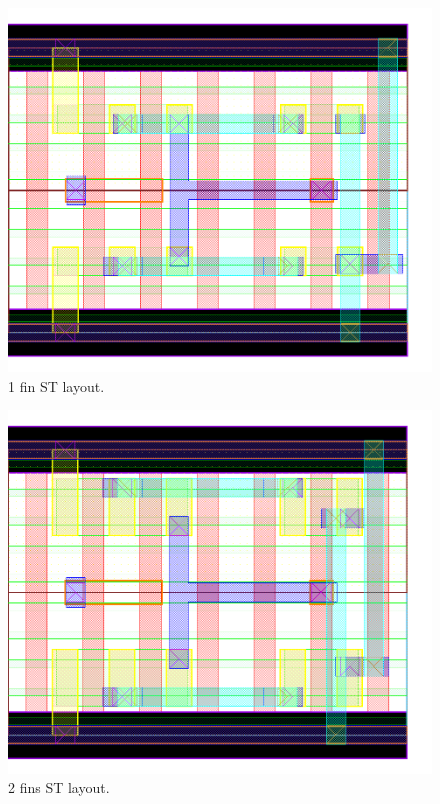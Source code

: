 \documentclass[pgmicro,mestrado,english]{iiufrgs}
\begin{document}
\begin{figure}[]
\centering
\includegraphics[width=\textwidth,height=\textheight,keepaspectratio]{ST1F.png}
\caption{1 fin ST layout.}
\label{fig:ST1F}
\end{figure}

\begin{figure}[]
\centering
\includegraphics[width=\textwidth,height=\textheight,keepaspectratio]{ST2F.png}
\caption{2 fins ST layout.}
\label{fig:ST2F}
\end{figure}
\end{document}
